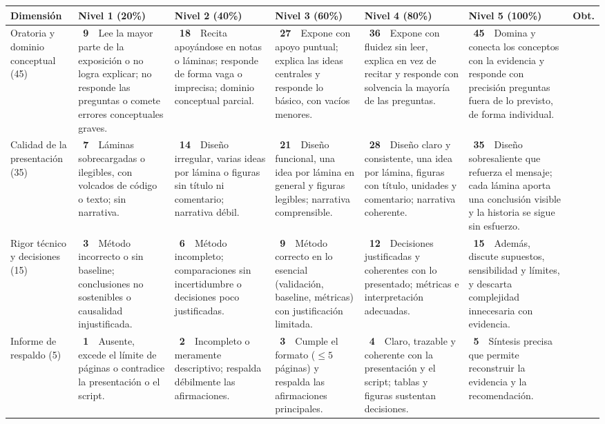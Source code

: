 \documentclass[11pt,letterpaper]{article}
\newcommand{\chk}{\framebox[0.42cm]{\rule{0pt}{0.30cm}}}
\begin{document}
\begin{tabular}{p{2.4cm} p{3.15cm} p{3.15cm} p{3.15cm} p{3.15cm} p{3.15cm} p{1.2cm}}
\toprule
Dimensión & Nivel 1 (20\%) & Nivel 2 (40\%) & Nivel 3 (60\%) & Nivel 4 (80\%) & Nivel 5 (100\%) & Obt. \\
\midrule
Oratoria y dominio conceptual (45) & \chk\ \textbf{9}~~Lee la mayor parte de la exposición o no logra explicar; no responde las preguntas o comete errores conceptuales graves. & \chk\ \textbf{18}~~Recita apoyándose en notas o láminas; responde de forma vaga o imprecisa; dominio conceptual parcial. & \chk\ \textbf{27}~~Expone con apoyo puntual; explica las ideas centrales y responde lo básico, con vacíos menores. & \chk\ \textbf{36}~~Expone con fluidez sin leer, explica en vez de recitar y responde con solvencia la mayoría de las preguntas. & \chk\ \textbf{45}~~Domina y conecta los conceptos con la evidencia y responde con precisión preguntas fuera de lo previsto, de forma individual. & \rule{0pt}{0.7cm} \\
Calidad de la presentación (35) & \chk\ \textbf{7}~~Láminas sobrecargadas o ilegibles, con volcados de código o texto; sin narrativa. & \chk\ \textbf{14}~~Diseño irregular, varias ideas por lámina o figuras sin título ni comentario; narrativa débil. & \chk\ \textbf{21}~~Diseño funcional, una idea por lámina en general y figuras legibles; narrativa comprensible. & \chk\ \textbf{28}~~Diseño claro y consistente, una idea por lámina, figuras con título, unidades y comentario; narrativa coherente. & \chk\ \textbf{35}~~Diseño sobresaliente que refuerza el mensaje; cada lámina aporta una conclusión visible y la historia se sigue sin esfuerzo. & \rule{0pt}{0.7cm} \\
Rigor técnico y decisiones (15) & \chk\ \textbf{3}~~Método incorrecto o sin baseline; conclusiones no sostenibles o causalidad injustificada. & \chk\ \textbf{6}~~Método incompleto; comparaciones sin incertidumbre o decisiones poco justificadas. & \chk\ \textbf{9}~~Método correcto en lo esencial (validación, baseline, métricas) con justificación limitada. & \chk\ \textbf{12}~~Decisiones justificadas y coherentes con lo presentado; métricas e interpretación adecuadas. & \chk\ \textbf{15}~~Además, discute supuestos, sensibilidad y límites, y descarta complejidad innecesaria con evidencia. & \rule{0pt}{0.7cm} \\
Informe de respaldo (5) & \chk\ \textbf{1}~~Ausente, excede el límite de páginas o contradice la presentación o el script. & \chk\ \textbf{2}~~Incompleto o meramente descriptivo; respalda débilmente las afirmaciones. & \chk\ \textbf{3}~~Cumple el formato ($\leq 5$ páginas) y respalda las afirmaciones principales. & \chk\ \textbf{4}~~Claro, trazable y coherente con la presentación y el script; tablas y figuras sustentan decisiones. & \chk\ \textbf{5}~~Síntesis precisa que permite reconstruir la evidencia y la recomendación. & \rule{0pt}{0.7cm} \\
\bottomrule
\end{tabular}
\end{document}
